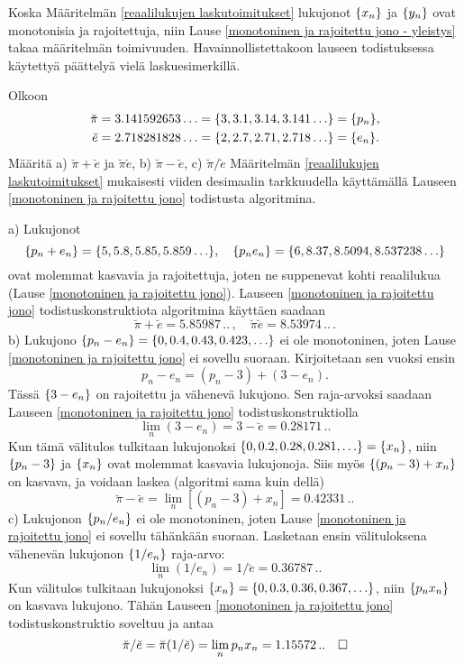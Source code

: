Koska Määritelmän \ref{reaalilukujen laskutoimitukset} lukujonot $\{x_n\}$ ja $\{y_n\}$ ovat
monotonisia ja rajoitettuja, niin Lause \ref{monotoninen ja rajoitettu jono - yleistys} takaa
määritelmän toimivuuden. Havainnollistettakoon lauseen todistuksessa käytettyä päättelyä vielä
laskuesimerkillä.
\begin{Exa} \label{laskuesimerkki desimaaliluvuilla pi ja e} Olkoon
\begin{align*}
\breve{\pi} &= 3.141592653\ldots = \{3,3.1,3.14,3.141\ldots\} = \{p_n\}, \\
\breve{e}   &= 2.718281828\ldots = \{2,2.7,2.71,2.718\ldots\} = \{e_n\}.
\end{align*}
Määritä a) $\breve{\pi}+\breve{e}$ ja $\breve{\pi}\breve{e}$, b) $\breve{\pi}-\breve{e}$,
c) $\breve{\pi}/\breve{e}$ Määritelmän \ref{reaalilukujen laskutoimitukset} mukaisesti
viiden desimaalin tarkkuudella käyttämällä Lauseen \ref{monotoninen ja rajoitettu jono}
todistusta algoritmina.
\end{Exa}
\ratk a) Lukujonot
\[
\{p_n+e_n\}=\{5,5.8,5.85,5.859\ldots\}, \quad 
\{p_ne_n\}=\{6,8.37,8.5094,8.537238\ldots\}
\]
ovat molemmat kasvavia ja rajoitettuja, joten ne suppenevat kohti reaalilukua
(Lause \ref{monotoninen ja rajoitettu jono}). Lauseen \ref{monotoninen ja rajoitettu jono} 
todistuskonstruktiota algoritmina käyttäen saadaan
\[
\breve{\pi}+\breve{e} = 5.85987\,..\,, \quad \breve{\pi}\breve{e}  = 8.53974\,..\,.
\]
b) Lukujono $\{p_n-e_n\}=\{0,0.4,0.43,0.423,\ldots\}$ ei ole monotoninen, joten Lause
\ref{monotoninen ja rajoitettu jono} ei sovellu suoraan. Kirjoitetaan sen vuoksi ensin
\[
p_n-e_n = (p_n-3) + (3-e_n).
\]
Tässä $\{3-e_n\}$ on rajoitettu ja vähenevä lukujono. Sen raja-arvoksi saadaan Lauseen
\ref{monotoninen ja rajoitettu jono} todistuskonstruktiolla
\[
\lim_n(3-e_n) = 3-\breve{e} = 0.28171\,..
\]
Kun tämä välitulos tulkitaan lukujonoksi $\{0,0.2,0.28,0.281,\ldots\}=\{x_n\}$, niin
$\{p_n-3\}$ ja $\{x_n\}$ ovat molemmat kasvavia lukujonoja. Siis myös $\{(p_n-3)+x_n\}$
on kasvava, ja voidaan laskea (algoritmi sama kuin dellä)
\[
\breve{\pi}-\breve{e} = \lim_n[(p_n-3)+x_n] = 0.42331\,.. 
\]
c) Lukujonon $\{p_n/e_n\}$ ei ole monotoninen, joten Lause
\ref{monotoninen ja rajoitettu jono} ei sovellu tähänkään suoraan. Lasketaan ensin
välituloksena vähenevän lukujonon $\{1/e_n\}$ raja-arvo:
\[
\lim_n(1/e_n) = 1/\breve{e} = 0.36787\,..
\]
Kun välitulos tulkitaan lukujonoksi $\{x_n\}=\{0,0.3,0.36,0.367,\ldots\}$, niin
$\{p_nx_n\}$ on kasvava lukujono. Tähän Lauseen \ref{monotoninen ja rajoitettu jono}
todistuskonstruktio soveltuu ja antaa
\[
\breve{\pi}/\breve{e} = \breve{\pi}(1/\breve{e}) = \lim_n p_nx_n = 1.15572\,.. \quad \square
\]

